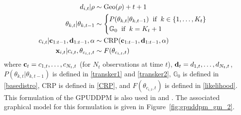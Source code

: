\documentclass[smallcondensed, final]{svjour3}
\begin{document}
\begin{align}
\begin{split}
d_{i,t} | \rho  &\sim \text{Geo}(\rho) + t + 1 \\
\theta_{k, t} | \theta_{k, t-1}  &\sim
\begin{cases}
P(\theta_{k,t} | \theta_{k,t-1}) \hspace{2mm} \text{if} \hspace{2mm} k \in \{ 1, \ldots, K_{t} \} \\
\mathbb{G}_{0} \hspace{2mm} \text{if} \hspace{2mm} k = K_{t} + 1
\end{cases} \\
c_{i,t} | \bold{c}_{1:t-1}, \bold{d}_{1:t-1}, \alpha  &\sim  \text{CRP}(\bold{c}_{1:t-1}, \bold{d}_{1:t-1}, \alpha) \\
\bold{x}_{i,t} | c_{i,t}, \theta_{c_{i,t},t}  &\sim  F(\theta_{c_{i,t}, t})
\end{split}
\end{align}
where $\bold{c}_{t} = c_{1,t}, \ldots, c_{N_{t}, t}$ (for $N_{t}$ observations at time $t$), $\bold{d}_{t} = d_{1,t}, \ldots, d_{N_{t}, t}$, $P(\theta_{k,t} | \theta_{k,t-1})$ is defined in \eqref{transker1} and \eqref{transker2}, $\mathbb{G}_{0}$ is defined in \eqref{basedistro}, CRP is defined in \eqref{CRP}, and $F(\theta_{c_{i,t}, t})$ is defined in \eqref{likelihood}. This formulation of the GPUDDPM is also used in \cite{gasthaus_thesis} and \cite{caron_2007}. The associated graphical model for this formulation is given in Figure~\ref{fig:gpuddpm_gm_2}.
\end{document}
